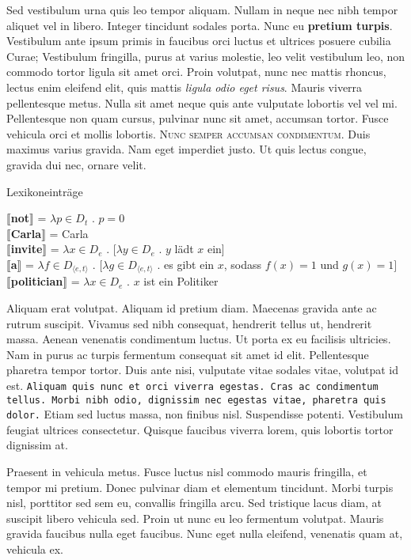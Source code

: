 \documentclass[
  11pt,
  numbers=noenddot,
  open=any,
  paper=a4,
  oneside,
  pagesize,
  captions=tableheading,
  bibliography=totoc,
  ]{scrbook}
\newcommand{\sem}[1]{\mbox{$\llbracket$\sffamily\textbf{#1}$\rrbracket$}}
\begin{document}
Sed vestibulum urna quis leo tempor aliquam. Nullam in neque nec nibh tempor aliquet vel in libero. Integer tincidunt sodales porta. Nunc eu \textbf{pretium turpis}. Vestibulum ante ipsum primis in faucibus orci luctus et ultrices posuere cubilia Curae; Vestibulum fringilla, purus at varius molestie, leo velit vestibulum leo, non commodo tortor ligula sit amet orci. Proin volutpat, nunc nec mattis rhoncus, lectus enim eleifend elit, quis mattis \textit{ligula odio eget risus}. Mauris viverra pellentesque metus. Nulla sit amet neque quis ante vulputate lobortis vel vel mi. Pellentesque non quam cursus, pulvinar nunc sit amet, accumsan tortor. Fusce vehicula orci et mollis lobortis. \textsc{Nunc semper accumsan condimentum}. Duis maximus varius gravida. Nam eget imperdiet justo. Ut quis lectus congue, gravida dui nec, ornare velit.

\begin{exe}
  \ex Lexikoneinträge
  
  \sem{not} = $\lambda p \in D_t$ . $p=0$\\
	\sem{Carla} = Carla\\
	\sem{invite} = $\lambda x \in D_e$ . [$\lambda y \in D_e$ . $y$ lädt $x$ ein]\\
	\sem{a} = $\lambda f \in D_{\langle e, t\rangle}$ . $[\lambda g \in D_{\langle e, t\rangle}$ . es gibt ein $x$, sodass $f(x)=1$ und $g(x)=1]$\\
	\sem{politician} = $\lambda x \in D_e$ . $x$ ist ein Politiker
\end{exe}

Aliquam erat volutpat. Aliquam id pretium diam. Maecenas gravida ante ac rutrum suscipit. Vivamus sed nibh consequat, hendrerit tellus ut, hendrerit massa. Aenean venenatis condimentum luctus. Ut porta ex eu facilisis ultricies. Nam in purus ac turpis fermentum consequat sit amet id elit. Pellentesque pharetra tempor tortor. Duis ante nisi, vulputate vitae sodales vitae, volutpat id est. \texttt{Aliquam quis nunc et orci viverra egestas. Cras ac condimentum tellus. Morbi nibh odio, dignissim nec egestas vitae, pharetra quis dolor.} Etiam sed luctus massa, non finibus nisl. Suspendisse potenti. Vestibulum feugiat ultrices consectetur. Quisque faucibus viverra lorem, quis lobortis tortor dignissim at.

{\sffamily Praesent in vehicula metus. Fusce luctus nisl commodo mauris fringilla, et tempor mi pretium. Donec pulvinar diam et elementum tincidunt. Morbi turpis nisl, porttitor sed sem eu, convallis fringilla arcu. Sed tristique lacus diam, at suscipit libero vehicula sed. Proin ut nunc eu leo fermentum volutpat. Mauris gravida faucibus nulla eget faucibus. Nunc eget nulla eleifend, venenatis quam at, vehicula ex.}
  
\end{document}
